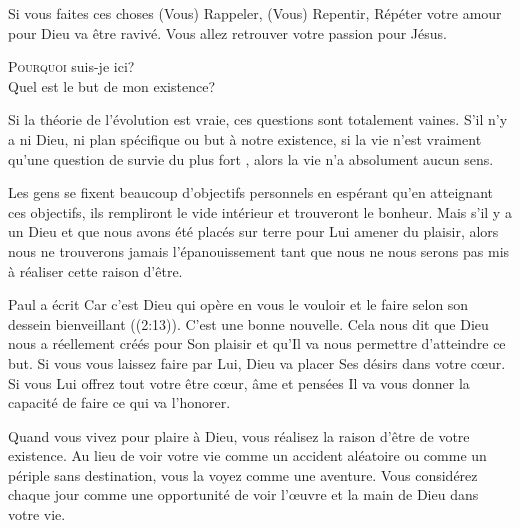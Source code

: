 Si vous faites ces choses
 \ocadr (Vous) Rappeler, (Vous) Repentir, Répéter \fcadr{}
 votre amour pour Dieu va être ravivé.
 Vous allez retrouver votre passion pour Jésus. 

\dvrule






\lettrine{P}{ourquoi} suis-je ici?\\
 Quel est le but de mon existence?

Si la théorie de l'évolution est vraie, ces questions sont totalement vaines.
 S'il n'y a ni Dieu, ni plan spécifique ou but à notre existence,
 si la vie n'est vraiment qu'une question de \Og survie du plus fort \Fg{},
 alors la vie n'a absolument aucun sens. 

Les gens se fixent beaucoup d'objectifs personnels en espérant
 qu'en atteignant ces objectifs, ils rempliront le vide intérieur
 et trouveront le bonheur. Mais s'il y a un Dieu et que nous avons
 été placés sur terre pour Lui amener du plaisir,
 alors nous ne trouverons jamais l'épanouissement
 tant que nous ne nous serons pas mis à réaliser cette raison d'être. 


Paul a écrit\frcolon{} 
 \Og Car c'est Dieu qui opère en vous le vouloir et le faire
 selon son dessein bienveillant \Fg{} ((2:13)).
 C'est une bonne nouvelle. Cela nous dit que Dieu nous a réellement
 créés pour Son plaisir \ocadr et qu'Il va nous permettre d'atteindre ce but.
 Si vous vous laissez faire par Lui, Dieu va placer Ses désirs
 dans votre c\oe{}ur. Si vous Lui offrez tout votre être
 \ocadr c\oe{}ur, âme et pensées \fcadr{} Il va vous donner la capacité
 de faire ce qui va l'honorer. 

Quand vous vivez pour plaire à Dieu, vous réalisez la raison d'être
 de votre existence. Au lieu de voir votre vie comme un accident aléatoire
 ou comme un périple sans destination, vous la voyez comme une aventure.
 Vous considérez chaque jour comme une opportunité de voir l'\oe{}uvre
 et la main de Dieu dans votre vie. 

